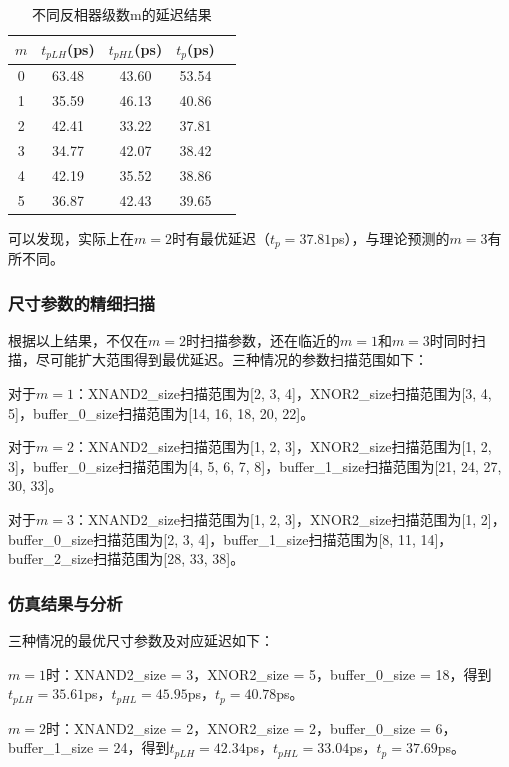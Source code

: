 \documentclass[UTF8,12pt,a4paper]{ctexart}
\begin{document}
\begin{table}[htbp]
\centering
\caption{不同反相器级数m的延迟结果}
\label{tab:task2_m}
\begin{tabular}{|c|c|c|c|c|}
\hline
$m$ & $t_{pLH}$(ps) & $t_{pHL}$(ps) & $t_p$(ps) \\
\hline
0 & 63.48 & 43.60 & 53.54 \\
1 & 35.59 & 46.13 & 40.86 \\
2 & 42.41 & 33.22 & 37.81 \\
3 & 34.77 & 42.07 & 38.42 \\
4 & 42.19 & 35.52 & 38.86 \\
5 & 36.87 & 42.43 & 39.65 \\
\hline
\end{tabular}
\end{table}

可以发现，实际上在$m = 2$时有最优延迟（$t_p = 37.81$ps），与理论预测的$m = 3$有所不同。

\subsubsection{尺寸参数的精细扫描}

根据以上结果，不仅在$m = 2$时扫描参数，还在临近的$m = 1$和$m = 3$时同时扫描，尽可能扩大范围得到最优延迟。三种情况的参数扫描范围如下：

对于$m = 1$：XNAND2\_size扫描范围为[2, 3, 4]，XNOR2\_size扫描范围为[3, 4, 5]，buffer\_0\_size扫描范围为[14, 16, 18, 20, 22]。

对于$m = 2$：XNAND2\_size扫描范围为[1, 2, 3]，XNOR2\_size扫描范围为[1, 2, 3]，buffer\_0\_size扫描范围为[4, 5, 6, 7, 8]，buffer\_1\_size扫描范围为[21, 24, 27, 30, 33]。

对于$m = 3$：XNAND2\_size扫描范围为[1, 2, 3]，XNOR2\_size扫描范围为[1, 2]，buffer\_0\_size扫描范围为[2, 3, 4]，buffer\_1\_size扫描范围为[8, 11, 14]，buffer\_2\_size扫描范围为[28, 33, 38]。

\subsubsection{仿真结果与分析}

三种情况的最优尺寸参数及对应延迟如下：

$m = 1$时：XNAND2\_size = 3，XNOR2\_size = 5，buffer\_0\_size = 18，得到$t_{pLH} = 35.61$ps，$t_{pHL} = 45.95$ps，$t_p = 40.78$ps。

$m = 2$时：XNAND2\_size = 2，XNOR2\_size = 2，buffer\_0\_size = 6，buffer\_1\_size = 24，得到$t_{pLH} = 42.34$ps，$t_{pHL} = 33.04$ps，$t_p = 37.69$ps。
\end{document}

